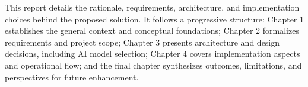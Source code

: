 This report details the rationale, requirements, architecture, and implementation choices behind the proposed solution. It follows a progressive structure: Chapter 1 establishes the general context and conceptual foundations; Chapter 2 formalizes requirements and project scope; Chapter 3 presents architecture and design decisions, including AI model selection; Chapter 4 covers implementation aspects and operational flow; and the final chapter synthesizes outcomes, limitations, and perspectives for future enhancement.

\clearpage
